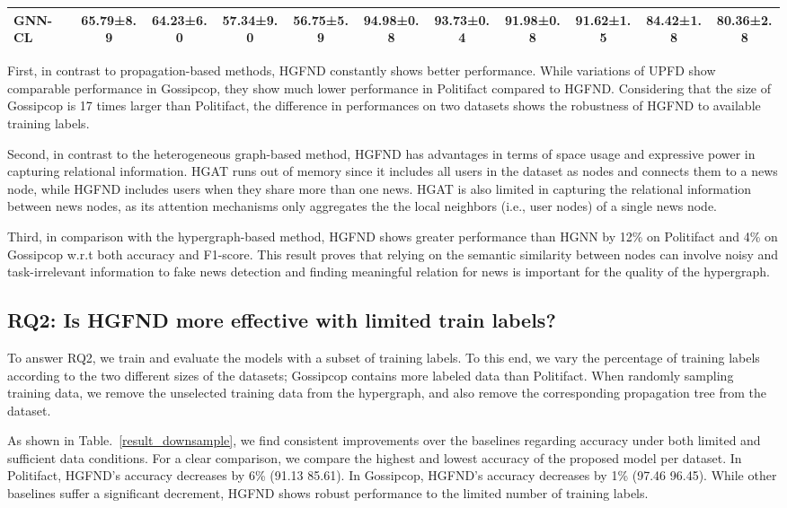 \documentclass[conference]{IEEEtran}
\begin{document}
\begin{table*}[!htbp]
\begin{tabular}{lcccccccccc}
GNN-CL        &  65.79±8.9   &     64.23±6.0      &     57.34±9.0      &      56.75±5.9     &   94.98±0.8& 93.73±0.4  &     91.98±0.8      &     91.62±1.5      &    84.42±1.8 &80.36±2.8     \\
\hline
\end{tabular}
\end{table*}


First, in contrast to propagation-based methods, HGFND constantly shows better performance. While variations of UPFD show comparable performance in Gossipcop, they show much lower performance in Politifact compared to HGFND. Considering that the size of Gossipcop is 17 times larger than Politifact, the difference in performances on two datasets shows the robustness of HGFND to available training labels.

Second, in contrast to the heterogeneous graph-based method, HGFND has advantages in terms of space usage and expressive power in capturing relational information. HGAT runs out of memory since it includes all users in the dataset as nodes and connects them to a news node, while HGFND includes users when they share more than one news. HGAT is also limited in capturing the relational information between news nodes, as its attention mechanisms only aggregates the the local neighbors (i.e., user nodes) of a single news node.

Third, in comparison with the hypergraph-based method, HGFND shows greater performance than HGNN by 12\% on Politifact and 4\% on Gossipcop w.r.t both accuracy and F1-score. This result proves that relying on the semantic similarity between nodes can involve noisy and task-irrelevant information to fake news detection and finding meaningful relation for news is important for the quality of the hypergraph.

\subsection{RQ2: Is HGFND more effective with limited train labels?}


To answer RQ2, we train and evaluate the models with a subset of training labels. To this end, we vary the percentage of training labels according to the two different sizes of the datasets; Gossipcop contains more labeled data than Politifact. When randomly sampling training data, we remove the unselected training data from the hypergraph, and also remove the corresponding propagation tree from the dataset.

As shown in Table.~\ref{result_downsample}, we find consistent improvements over the baselines regarding accuracy under both limited and sufficient data conditions. For a clear comparison, we compare the highest and lowest accuracy of the proposed model per dataset. In Politifact, HGFND's accuracy decreases by 6\% (91.13  85.61). In Gossipcop, HGFND's accuracy decreases by 1\% (97.46  96.45). While other baselines suffer a significant decrement, HGFND shows robust performance to the limited number of training labels.
\end{document}
